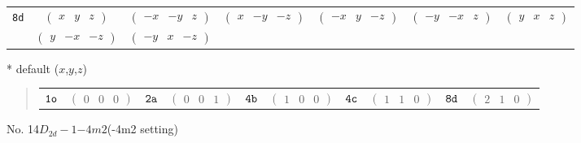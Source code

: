 \documentclass[fleqn,9pt,landscape]{jsarticle}
\begin{document}
\begin{center}
\begin{longtable}{ccccccc}
{\tt 8d} & $ \begin{pmatrix} x & y & z \end{pmatrix} $ & $ \begin{pmatrix} - x & - y & z \end{pmatrix} $ & $ \begin{pmatrix} x & - y & - z \end{pmatrix} $ & $ \begin{pmatrix} - x & y & - z \end{pmatrix} $ & $ \begin{pmatrix} - y & - x & z \end{pmatrix} $ & $ \begin{pmatrix} y & x & z \end{pmatrix} $ \\
& $ \begin{pmatrix} y & - x & - z \end{pmatrix} $ & $ \begin{pmatrix} - y & x & - z \end{pmatrix} $ & $  $ & $  $ & $  $ & $  $ \\
\end{longtable}
\end{center}
* default ($x$,$y$,$z$)
\begin{quote}
\begin{tabular}{cccccccccc}
$ {\tt 1o} $ & $ \begin{pmatrix} 0 & 0 & 0 \end{pmatrix} $ & $ {\tt 2a} $ & $ \begin{pmatrix} 0 & 0 & 1 \end{pmatrix} $ & $ {\tt 4b} $ & $ \begin{pmatrix} 1 & 0 & 0 \end{pmatrix} $ & $ {\tt 4c} $ & $ \begin{pmatrix} 1 & 1 & 0 \end{pmatrix} $ & $ {\tt 8d} $ & $ \begin{pmatrix} 2 & 1 & 0 \end{pmatrix} $
\end{tabular}
\end{quote}
\newpage
No. 14\quad$D_{2d}-1$\quad$-4m2$\quad(-4m2 setting)\quad[ tetragonal ]
\end{document}
